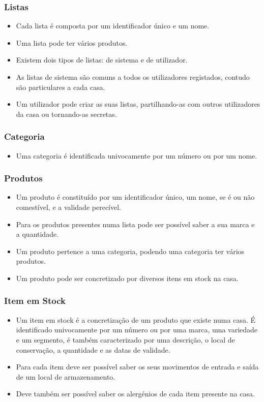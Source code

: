 \subsubsection{Listas}
\begin{itemize}
	\item Cada lista é composta por um identificador único e um nome.
	\item Uma lista pode ter vários produtos.
	\item Existem dois tipos de listas: de sistema e de utilizador. 
	\item As listas de sistema são comuns a todos os utilizadores registados, contudo são particulares a cada casa.	
	\item Um utilizador pode criar as suas listas, partilhando-as com outros utilizadores da casa ou tornando-as secretas.
\end{itemize}

\subsubsection{Categoria}
\begin{itemize}
	\item Uma categoria é identificada univocamente por um número ou por um nome.
\end{itemize}


\subsubsection{Produtos}
\begin{itemize}
	\item Um produto é constituído por um identificador único, um nome, se é ou não comestível, e a validade perecível.
	\item Para os produtos presentes numa lista pode ser possível saber a sua marca e a quantidade.
	\item Um produto pertence a uma categoria, podendo uma categoria ter vários produtos.
	\item Um produto pode ser concretizado por diversos itens em stock na casa.
\end{itemize}
 
\subsubsection{Item em Stock}
\begin{itemize}
	\item Um item em stock é a concretização de um produto que existe numa casa. É identificado univocamente por um número ou por uma marca, uma variedade e um segmento, é também caracterizado por uma descrição, o local de conservação, a quantidade e as datas de validade. 
	\item Para cada item deve ser possível saber os seus movimentos de entrada e saída de um local de armazenamento.
	\item Deve também ser possível saber os alergénios de cada item presente na casa.
\end{itemize}


